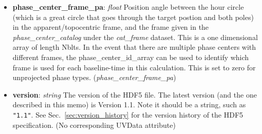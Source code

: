 \documentclass[11pt, oneside]{article}
\begin{document}
\begin{itemize}
This is a one-dimensional array of size Nblts. In the event that there are multiple phase centers,
the phase\_center\_id\_array can be used to identify which phase center is used for this
calculation. For unprojected phase types, this is just the telescope latitude.
(\textit{phase\_center\_app\_ra})
\item \textbf{phase\_center\_frame\_pa}: \textit{float}
Position angle between the hour circle (which is a great circle that goes through the target
postion and both poles) in the apparent/topocentric frame, and the frame given in the
\textit{phase\_center\_catalog} under the \textit{cat\_frame} dataset. This is a one dimensional array
of length Nblts. In the event that there are multiple phase centers with different frames,
the phase\_center\_id\_array can be used to identify which frame is used for each
baseline-time in this calculation. This is set to zero for unprojected phase types.
(\textit{phase\_center\_frame\_pa})

\item \textbf{version}: \textit{string} The version of the HDF5 file. The latest
  version (and the one described in this memo) is Version 1.1. Note it should be
  a string, such as \verb+"1.1"+. See Sec.~\ref{sec:version_history} for the
  version history of the HDF5 specification. (No corresponding UVData attribute)
\end{itemize}
\end{document}
